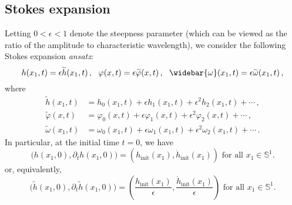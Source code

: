 \documentclass[11pt]{article}
\theoremstyle{plain}
\theoremstyle{definition}
\theoremstyle{definition}
\def\hinit{h_{\operatorname{init}}}
\def\htinit{{\dot h}_{\operatorname{init}}}
\begin{document}
\subsection{Stokes expansion}
Letting $0<\epsilon < 1 $ denote the steepness parameter (which can be
  viewed as the ratio of the amplitude to characteristic wavelength),
we consider the following Stokes expansion \emph{ansatz}:
\begin{equation}
\label{ansatz}
h(x_1,t)   =  \epsilon  \widetilde{h}(x_1, t) \,, \  \
\varphi(x,t)  = \epsilon  \widetilde{\varphi}( x, t)\,, \ \
\widebar{\omega}(x_1,t)  = \epsilon  \widetilde{\omega}( x_1, t) \,,
\end{equation}
where
\begin{subequations}\label{expansions}
\begin{align}
\widetilde{h}(x_1,t) &= h_0(x_1,t) + \epsilon h_1(x_1,t) + \epsilon^2 h_2(x_1,t) + \cdots\,,\\
\widetilde{\varphi}(x,t) &= \varphi_0(x,t) + \epsilon \varphi_1(x,t) + \epsilon^2 \varphi_2(x,t) + \cdots\,,\\
\widetilde{\omega}(x_1,t) &= \omega_0(x_1,t) + \epsilon \omega_1(x_1,t) + \epsilon^2 \omega_2(x_1,t) + \cdots\,.
\end{align}
\end{subequations}
In particular, at the initial time $t=0$, we have
\begin{equation}\label{initialdata}
(h(x_1,0),\partial_t h(x_1,0)\big) = \left(\hinit(x_1),\htinit(x_1)\right)\text{ for all $x_1\in \mathbb{S}^1$}.
\end{equation}
or, equivalently,
\begin{equation}\label{initialdata2}
(\widetilde{h}(x_1,0),\partial_t \widetilde{h}(x_1,0)\big) = \left(\frac{\hinit(x_1)}{\epsilon}, \frac{\htinit(x_1)}{\epsilon}\right)\text{ for all $x_1\in \mathbb{S}^1$}.
\end{equation}
\end{document}
